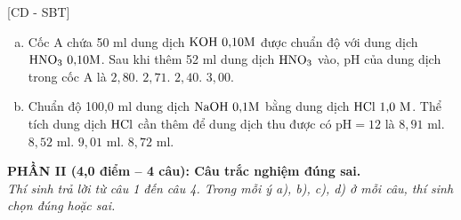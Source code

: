 \documentclass[12pt,a4paper]{article}
\begin{document}
\begin{ex}
{[CD - SBT]}
\begin{enumerate}[a)]
	\item Cốc A chứa 50 ml dung dịch $\ce{KOH}\ 0{,}10\text{M}$ được chuẩn độ với dung dịch $\ce{HNO3}\ 0{,}10\text{M}$. Sau khi thêm 52 ml dung dịch $\ce{HNO3}$ vào, pH của dung dịch trong cốc A là
	\choice
	{$2{,}80$.}
	{\True $2{,}71$.}
	{$2{,}40$.}
	{$3{,}00$.}
	\item Chuẩn độ 100,0 ml dung dịch $\ce{NaOH}\ 0{,}1\text{M}$ bằng dung dịch $\ce{HCl}\ 1{,}0\text{ M}$. Thể tích dung dịch $\ce{HCl}$ cần thêm để dung dịch thu được có $\text{pH} = 12$ là
	\choice
	{\True $8{,}91\text{ ml}$.}
	{$8{,}52\text{ ml}$.}
	{$9{,}01\text{ ml}$.}
	{$8{,}72\text{ ml}$.}
\end{enumerate}
\end{ex}


\bigskip
\noindent
\textbf{PHẦN II (4,0 điểm -- 4 câu): Câu trắc nghiệm đúng sai.}\\
\textit{Thí sinh trả lời từ câu 1 đến câu 4. Trong mỗi ý a), b), c), d) ở mỗi câu, thí sinh chọn đúng hoặc sai.}
\end{document}
